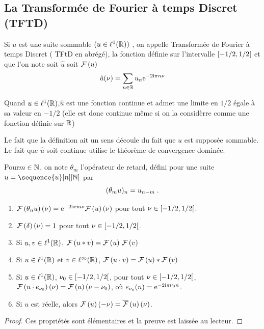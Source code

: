 \subsection{La Transform\'{e}e de Fourier \`{a} temps Discret (TFTD)}

\begin{definition}
Si $u$ est une suite sommable $(u\in \ell^1(\mathbb{R}))$ , on appelle Transform\'{e}e de Fourier \`{a} temps Discret ( TFtD en abr\'{e}g\'{e}), la fonction d\'{e}finie sur l'intervalle $\left[-1/2,1/2\right[$
et que l'on note soit $\hat{u}$ soit $\mathcal{F}\left( u \right)$
$$
\hat{u}(\nu)=\sum_{n\in \mathbb{R}}u_{n}\mathrm{e}^{-2\mathrm{i}\pi n \nu }
$$
\end{definition}
Quand $u\in \ell^1(\mathbb{R})$,$\hat{u}$ est une fonction continue et admet une limite en $1/2$ \'{e}gale \`{a} sa valeur en $-1/2$
(elle est donc continue m\^{e}me si on la consid\`erre comme une fonction d\'{e}finie sur $\mathbb{R}$)

Le fait que la d\'{e}finition ait un sens d\'{e}coule du fait que $u$ est suppos\'{e}e sommable. Le fait que $\hat{u}$ soit continue utilise le th\'{e}or\`{e}me de convergence domin\'{e}e.

Pour$m \in \mathbb{N}$, on note $\theta_m$ l'op\'erateur de retard, d\'efini pour une suite $u= \sequence{u}[n][\nset]$ par
\begin{equation}
(\theta_m u)_n = u_{n-m} \;.
\end{equation}
\begin{proposition}
\label{prop:propriete-TFTD}
\begin{enumerate}[label=(\roman*)]
\item $\mathcal{F}\left( \theta_n u \right)(\nu)= \mathrm{e}^{- 2 \mathrm{i} \pi m \nu} \mathcal{F}\left( u \right)(\nu)$ pour tout $\nu \in \left[-1/2,1/2\right[$.
\item $\mathcal{F}\left( \delta \right)(\nu) = 1$ pour tout $\nu \in \left[-1/2,1/2\right[$.
\item Si $u, v \in \ell^1(\mathbb{R})$, $\mathcal{F}\left( u * v \right)= \mathcal{F}\left( u \right) \, \mathcal{F}\left( v \right)$
\item Si $u \in \ell^1(\mathbb{R})$ et $v \in \ell^\infty(\mathbb{R})$, $\mathcal{F}\left( u \cdot v \right)=\mathcal{F}\left( u \right)*\mathcal{F}\left( v \right)$
\item Si $u \in \ell^1(\mathbb{R})$, $\nu_0 \in \left[-1/2,1/2\right[$, pour tout $\nu \in \left[-1/2,1/2\right[$,
$\mathcal{F}\left(  u \cdot e_{\nu_0} \right)(\nu)= \mathcal{F}\left( u \right)(\nu - \nu_0)$, o\`u $e_{\nu_0}(n) = \mathrm{e}^{-2 \mathrm{i} \pi \nu_0 n}$.
\item Si $u$ est r\'{e}elle, alors $\mathcal{F}\left( u \right)(-\nu) = \overline{\mathcal{F}}\left( u \right)(\nu)$.
\end{enumerate}
\end{proposition}
\begin{proof}
Ces propri\'et\'es sont \'el\'ementaires et la preuve est laiss\'ee au lecteur.
\end{proof}

